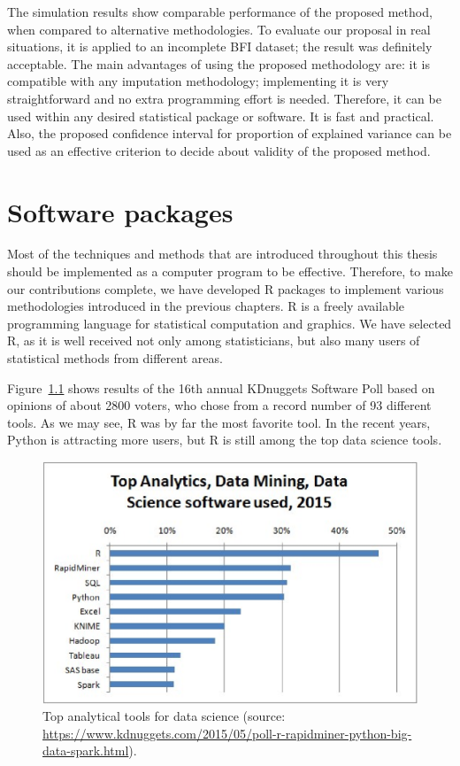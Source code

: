 \documentclass[11pt,a5paper,twoside]{book}
\begin{document}
The simulation results show comparable performance of the proposed method, when compared to alternative methodologies. To evaluate our proposal in real situations, it is applied to an incomplete BFI dataset; the result was definitely acceptable. The main advantages of using the proposed methodology are: it is compatible with any imputation methodology; implementing it is very straightforward and no extra programming effort is needed. Therefore, it can be used within any desired statistical package or software. It is fast and practical. Also, the proposed confidence interval for proportion of explained variance can be used as an effective criterion to decide about validity of the proposed method.


\chapter{Software packages}


Most of the techniques and methods that are introduced throughout this thesis should be implemented as a computer program to be effective. Therefore, to make our contributions complete, we have developed R packages to implement various methodologies introduced in the previous chapters. R is a freely available programming language for statistical computation and graphics. We have selected R, as it is well received not only among statisticians, but also many users of statistical methods from different areas.

Figure~\ref{languages} shows results of the 16th annual KDnuggets Software Poll based on opinions of about 2800 voters, who chose from a record number of 93 different tools. As we may see, R was by far the most favorite tool. In the recent years, Python is attracting more users, but R is still among the top data science tools.


\begin{figure}[!t]
\centering
\includegraphics[width=\textwidth]{languages.eps}
\caption[Top analytical tools for data science]{\small \linespread{1.1} Top analytical tools for data science (source: \protect\url{https://www.kdnuggets.com/2015/05/poll-r-rapidminer-python-big-data-spark.html}).} \label{languages}
\end{figure}
\end{document}
